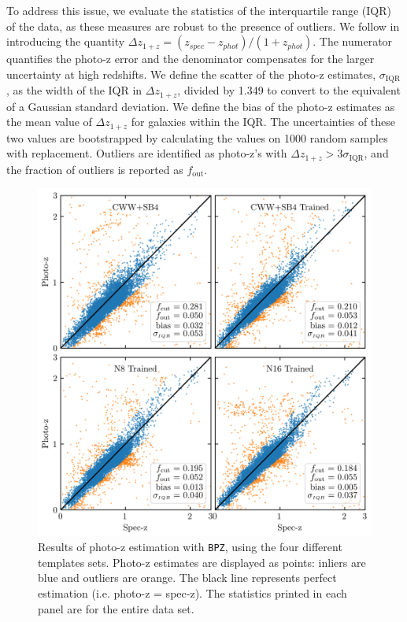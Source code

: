 \documentclass[twocolumn]{aastex63}
\newcommand{\pzcode}[1]{\texttt{#1}}
\newcommand{\bpz}{\pzcode{BPZ}}
\begin{document}
    To address this issue, we evaluate the statistics of the interquartile range (IQR) of the data, as these measures are robust to the presence of outliers.
    We follow \citet{Graham2018a} in introducing the quantity $\Delta z_{1+z} = (z_{spec} - z_{phot})/(1 + z_{phot})$.
    The numerator quantifies the photo-z error and the denominator compensates for the larger uncertainty at high redshifts. 
    We define the scatter of the photo-z estimates, $\sigma_\text{IQR}$,  as the width of the IQR in $\Delta z_{1+z}$, divided by 1.349 to convert to the equivalent of a Gaussian standard deviation. 
    We define the bias of the photo-z estimates as the mean value of $\Delta z_{1+z}$ for galaxies within the IQR.
    The uncertainties of these two values are bootstrapped by calculating the values on 1000 random samples with replacement. 
    Outliers are identified as photo-z's with $\Delta z_{1+z} > 3 \sigma_{\text{IQR}}$, and the fraction of outliers is reported as $f_\text{out}$.

    \begin{figure}
        \centering
        \includegraphics{photoz_results.png}
        \caption{Results of photo-z estimation with \bpz, using the four different templates sets. Photo-z estimates are displayed as points: inliers are blue and outliers are orange. The black line represents perfect estimation (i.e. photo-z = spec-z). The statistics printed in each panel are for the entire data set.}
        \label{fig:photoz_results}
    \end{figure}
\end{document}
